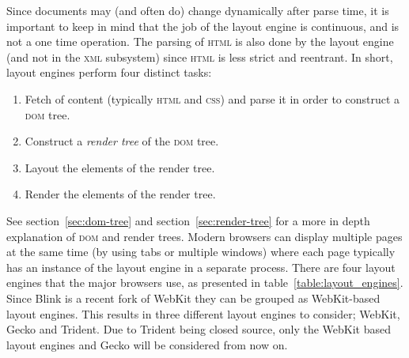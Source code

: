 \documentclass[a4paper,11pt]{kth-mag}
\begin{document}
      Since documents may (and often do) change dynamically after parse time, it is important to keep in mind that the job of the layout engine is continuous, and is not a one time operation.
      The parsing of \textsc{html} is also done by the layout engine (and not in the \textsc{xml} subsystem) since \textsc{html} is less strict and reentrant.
      In short, layout engines perform four distinct tasks:
      \begin{enumerate}
        \item Fetch of content (typically \textsc{html} and \textsc{css}) and parse it in order to construct a \textsc{dom} tree.
        \item Construct a \emph{render tree} of the \textsc{dom} tree.
        \item Layout the elements of the render tree.
        \item Render the elements of the render tree.
      \end{enumerate}
      See section~\ref{sec:dom-tree} and section~\ref{sec:render-tree} for a more in depth explanation of \textsc{dom} and render trees.
      Modern browsers can display multiple pages at the same time (by using tabs or multiple windows) where each page typically has an instance of the layout engine in a separate process.
      There are four layout engines that the major browsers use, as presented in table~\ref{table:layout_engines}.
      Since Blink is a recent fork of WebKit they can be grouped as WebKit-based layout engines.
      This results in three different layout engines to consider; WebKit, Gecko and Trident.
      Due to Trident being closed source, only the WebKit based layout engines and Gecko will be considered from now on.
\end{document}
